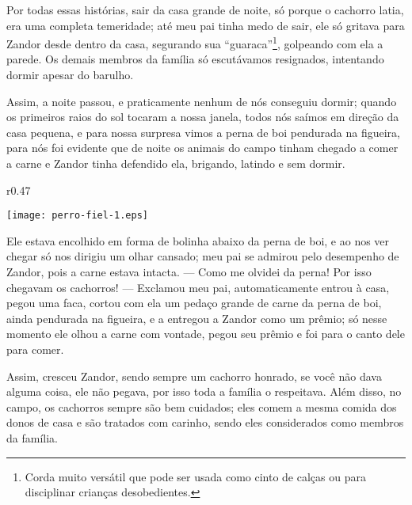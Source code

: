 Por todas essas histórias, sair da casa grande de noite, só porque o cachorro latia, era uma completa temeridade; até meu pai tinha medo de sair, ele só gritava para Zandor desde dentro da casa, segurando sua ``guaraca''\footnote{Corda muito versátil que pode ser usada como cinto de calças ou para disciplinar crianças desobedientes.}, golpeando com ela a parede. 
Os demais membros da família só escutávamos resignados, intentando dormir apesar do barulho.

Assim, a noite passou, e praticamente nenhum de nós conseguiu dormir; quando os primeiros raios do sol tocaram a nossa janela, todos nós saímos em direção da casa pequena, e para nossa surpresa vimos a perna de boi pendurada na figueira, para nós foi evidente que de noite os animais do campo tinham chegado a comer a carne e Zandor tinha defendido ela, brigando, latindo e sem dormir. 
\begin{wrapfigure}{r}{0.47\textwidth}
  \begin{center}
  \vspace{-0.5cm}
    \texttt{[image: perro-fiel-1.eps]}
  \end{center}
  \vspace{-0.5cm}
\end{wrapfigure}
Ele estava encolhido em forma de bolinha abaixo da perna de boi, e ao nos ver chegar só nos dirigiu um olhar cansado; meu pai se admirou pelo desempenho de Zandor, pois a carne estava intacta. --- Como me olvidei da perna! Por isso chegavam os cachorros! --- 
Exclamou meu pai, automaticamente entrou à casa, pegou uma faca, cortou com ela um pedaço grande de carne da perna de boi, ainda pendurada na figueira, e a entregou a Zandor como um prêmio; só nesse momento ele olhou a carne com vontade, pegou seu prêmio e foi para o canto dele para comer.

Assim, cresceu Zandor, sendo sempre um cachorro honrado, se você não dava alguma coisa, ele não pegava, por isso toda a família o respeitava. Além disso, no campo, os cachorros sempre são bem cuidados; eles comem a mesma comida dos donos de casa e são tratados com carinho, sendo eles considerados como membros da família.


